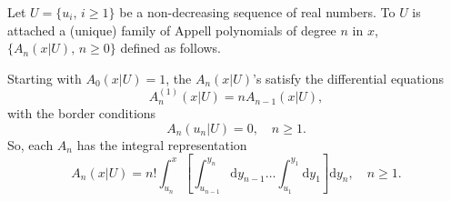 \noindent Let $U=\{u_i, \, i\geq 1\}$ be a non-decreasing sequence of real numbers. To $U$ is attached a (unique) family of Appell polynomials of degree $n$ in $x$, $\{A_{n}(x\vert U),\, n\geq 0\}$ defined as follows.
\begin{definition} 
Starting with $A_0(x\vert U)=1$, the $A_n(x\vert U)$'s satisfy the differential equations
\begin{equation}\label{eq:DifferentialEquationAppellPolynomial}
A_{n}^{(1)}(x|U)=nA_{n-1}(x|U),  
\end{equation}
with the border conditions
\begin{equation}\label{eq:Border AppellPolynomial}
A_{n}(u_{n}|U)=0, \quad n\geq 1.
\end{equation}
So, each $A_n$ has the integral representation
\begin{equation}\label{eq:IntegralRepresentationAppellPolynomials}
A_{n}(x|U)=n!\int_{u_{n}}^{x}\left[\int_{u_{n-1}}^{y_{n}}\text{d}y_{n-1} \ldots \int_{u_{1}}^{y_{1}}\text{d}y_{1}\right]\text{d}y_{n}, \quad n\geq 1.
\end{equation}
\end{definition}

